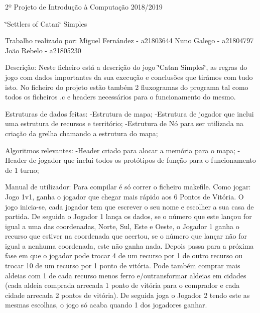 2º Projeto de Introdução à Computação 2018/2019

\char`\"{}\+Settlers of Catan\char`\"{} Simples \begin{DoxyVerb}Trabalho realizado por: 
Miguel Fernández - a21803644
Nuno Galego - a21804797
João Rebelo - a21805230
\end{DoxyVerb}


Descrição\+: Neste ficheiro está a descrição do jogo \char`\"{}\+Catan Simples\char`\"{}, as regras do jogo com dados importantes da sua execução e conclusões que tirámos com tudo isto. No ficheiro do projeto estão também 2 fluxogramas do programa tal como todos os ficheiros .c e headers necessários para o funcionamento do mesmo.

Estruturas de dados feitas\+: -\/\+Estrutura de mapa; -\/\+Estrutura de jogador que inclui uma estrutura de recursos e território; -\/\+Estrutura de Nó para ser utilizada na criação da grelha chamando a estrutura do mapa;

Algoritmos relevantes\+: -\/\+Header criado para alocar a memória para o mapa; -\/\+Header de jogador que inclui todos os protótipos de função para o funcionamento de 1 turno;

Manual de utilizador\+: Para compilar é só correr o ficheiro makefile. Como jogar\+: Jogo 1v1, ganha o jogador que chegar mais rápido aos 6 Pontos de Vitória. O jogo inicia-\/se, cada jogador tem que escrever o seu nome e escolher a sua casa de partida. De seguida o Jogador 1 lança os dados, se o número que este lançou for igual a uma das coordenadas, Norte, Sul, Este e Oeste, o Jogador 1 ganha o recurso que estiver na coordenada que acertou, se o número que lançar não for igual a nenhuma coordenada, este não ganha nada. Depois passa para a próxima fase em que o jogador pode trocar 4 de um recurso por 1 de outro recurso ou trocar 10 de um recurso por 1 ponto de vitória. Pode também comprar mais aldeias com 1 de cada recurso menos ferro e/outransformar aldeias em cidades (cada aldeia comprada arrecada 1 ponto de vitória para o comprador e cada cidade arrecada 2 pontos de vitória). De seguida joga o Jogador 2 tendo este as mesmas escolhas, o jogo só acaba quando 1 dos jogadores ganhar.

